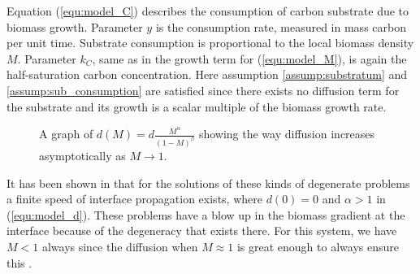 Equation (\ref{equ:model_C}) describes the consumption of carbon substrate due to biomass growth.
Parameter $y$ is the consumption rate, measured in mass carbon per unit time.
Substrate consumption is proportional to the local biomass density $M$. 
Parameter $k_C$, same as in the growth term for (\ref{equ:model_M}), is again the half-saturation carbon concentration.
Here assumption \ref{assump:substratum} and \ref{assump:sub_consumption} are satisfied since there exists no diffusion term for the substrate and its growth is a scalar multiple of the biomass growth rate.


\begin{figure}
  \centering
  \caption{A graph of $d(M) = d \frac{M^\alpha}{(1 - M)^\beta}$ showing the way diffusion increases asymptotically as $M \to 1$.}
  \label{fig:show_d}
\end{figure}

It has been shown in \cite{jalbert2014numerical} that for the solutions of these kinds of degenerate problems a finite speed of interface propagation exists, where $d(0) = 0$ and $\alpha >1$ in (\ref{equ:model_d}).
These problems have a blow up in the biomass gradient at the interface because of the degeneracy that exists there.
For this system, we have $M < 1$ always since the diffusion when $M \approx 1$ is great enough to always ensure this \citep{jalbert2014numerical}.


